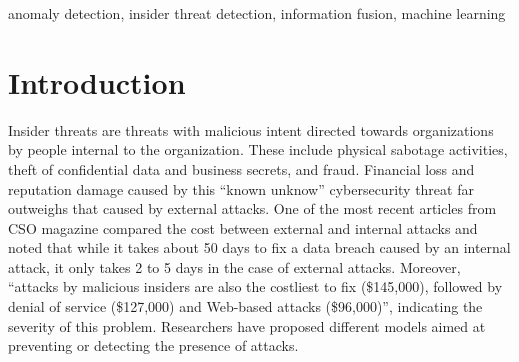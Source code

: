 \documentclass[conference]{IEEEtran}
\begin{document}
\begin{IEEEkeywords}
anomaly detection, insider threat detection, information fusion, machine learning
\end{IEEEkeywords}

\section{Introduction}

Insider threats are threats with malicious intent directed towards organizations by people internal to the organization.
These include physical sabotage activities, theft of confidential data and business secrets, and fraud. Financial loss and reputation damage caused by this ``known unknow'' cybersecurity threat far outweighs that caused by external attacks. One of the most recent articles from CSO magazine\cite{b3} compared the cost between external and internal attacks and noted that while it takes about 50 days to fix a data breach caused by an internal attack, it only takes 2 to 5 days in the case of external attacks. Moreover, “attacks by malicious insiders are also the costliest to fix (\$145,000), followed by denial of service (\$127,000) and Web-based attacks (\$96,000)”, indicating the severity of this problem. Researchers have proposed different models aimed at preventing or detecting the presence of attacks.
\end{document}
